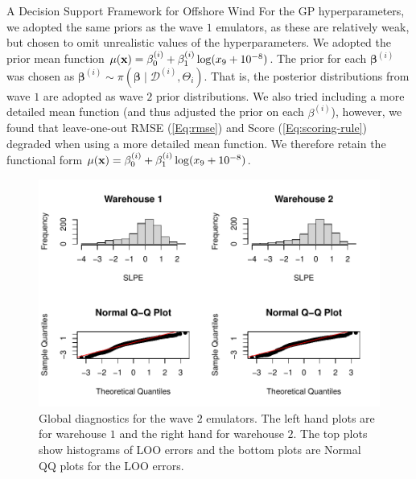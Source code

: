 \begin{chapter}{A Decision Support Framework for Offshore Wind \label{Ch:ds-for-ow}}
For the GP hyperparameters, we adopted the same priors as the wave $1$ emulators, as these are relatively weak, but chosen to omit unrealistic values of the hyperparameters. We adopted the prior mean function $\mu(\mathbf{x}) = \beta^{(i)}_0 + \beta^{(i)}_1 \log (x_9 + 10^{-8})$. The prior for each $\bm{\beta}^{(i)}$ was chosen as $\bm{\beta}^{(i)} \sim \pi(\bm{\beta} \mid \mathcal{D}^{(i)}, \Theta_i)$. That is, the posterior distributions from wave $1$ are adopted as wave $2$ prior distributions. We also tried including a more detailed mean function (and thus adjusted the prior on each $\beta^{(i)}$), however, we found that leave-one-out RMSE (\cref{Eq:rmse}) and Score (\cref{Eq:scoring-rule}) degraded when using a more detailed mean function. We therefore retain the functional form $\mu(\mathbf{x}) = \beta^{(i)}_0 + \beta^{(i)}_1 \log (x_9 + 10^{-8}) $.
\begin{figure}
 \centering
 \includegraphics{fig-ds/diagnostics-wave2.pdf}
 \caption{Global diagnostics for the wave $2$ emulators. The left hand plots are for warehouse $1$ and the right hand for warehouse $2$. The top plots show histograms of LOO errors and the bottom plots are Normal QQ plots for the LOO errors.\label{Fig:w2-global-diag}}
\end{figure}

\end{chapter}
